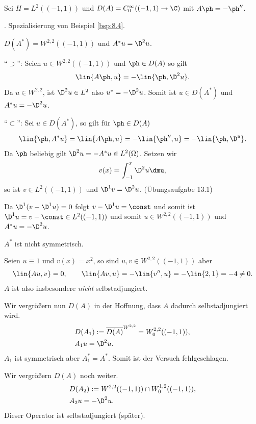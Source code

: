 \begin{bsp}
\label{bsp:8.10}
Sei $H=L^2((-1,1))$ und $D(A) = C_0^\infty((-1,1)\to\C)$ mit $A\ph = -\ph''$.
\begin{bspenum}
\item {}. Spezialisierung von Beispiel \ref{bsp:8.4}.
\item $D(A^*) = W^{2,2}((-1,1))$ und $A^* u = \D^2 u$.

``$\supset$'': Seien $u\in W^{2,2}((-1,1))$ und $\ph\in D(A)$ so gilt
\begin{align*}
\lin{A\ph,u} = -\lin{\ph, \D^2 u}.
\end{align*}
Da $u\in W^{2,2}$, ist $\D^2u\in L^2$ also $u^* = -\D^2 u$. Somit ist $u\in
D(A^*)$ und $A^* u = -\D^2 u$.

``$\subset$'': Sei $u\in D(A^*)$, so gilt für $\ph\in D(A)$
\begin{align*}
\lin{\ph,A^*u} = \lin{A\ph,u} =  - \lin{\ph'',u} = -\lin{\ph,\D^u}.
\end{align*}
Da $\ph$ beliebig gilt $\D^2u = -A^* u \in L^2(\Omega)$. Setzen wir
\begin{align*}
v(x)= \int_{-1}^x \D^2u\dmu, 
\end{align*}
so ist $v\in L^2((-1,1))$ und $\D^1 v = \D^2 u$. (Übungsaufgabe 13.1)

Da $\D^1(v-\D^1 u) = 0$ folgt $v-\D^1 u = \const$ und somit ist $\D^1 u =
v-\const\in L^2((-1,1))$ und somit $u\in W^{2,2}((-1,1))$ und $A^* u = -\D^2
u$.
\item $A^*$ ist nicht symmetrisch.

Seien $u\equiv 1$ und $v(x)=x^2$, so sind $u,v\in W^{2,2}((-1,1))$ aber
\begin{align*}
\lin{Au,v} = 0,\qquad \lin{Av,u} = -\lin{v'',u} = -\lin{2,1} = -4\neq 0.
\end{align*}
$A$ ist also insbesondere \textit{nicht} selbstadjungiert.
\item Wir vergrößern nun $D(A)$ in der Hoffnung, dass $A$ dadurch
selbstadjungiert wird.
\begin{align*}
&D(A_1) := \overline{D(A)}^{W^{2,2}} = W_0^{2,2}((-1,1)),\\
&A_1 u = \D^2 u.
\end{align*}
$A_1$ ist symmetrisch aber $A_1^*=A^*$. Somit ist der Versuch fehlgeschlagen.
\item Wir vergrößern $D(A)$ noch weiter.
\begin{align*}
&D(A_2) := W^{2,2}((-1,1))\cap W_0^{1,2}((-1,1)),\\
&A_2u = -\D^2 u.
\end{align*}
Dieser Operator ist selbstadjungiert (später).


\end{bspenum}
\end{bsp}
